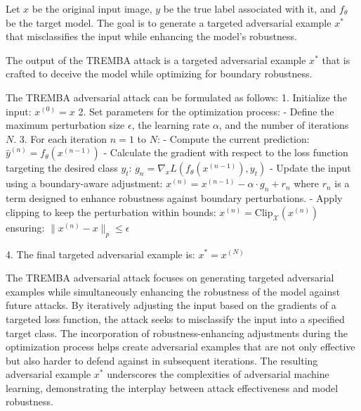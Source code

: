 Let $x$ be the original input image, $y$ be the true label associated with it, and $f_{\theta}$ be the target model. The goal is to generate a targeted adversarial example $x^*$ that misclassifies the input while enhancing the model's robustness.

The output of the TREMBA attack is a targeted adversarial example $x^*$ that is crafted to deceive the model while optimizing for boundary robustness.

The TREMBA adversarial attack can be formulated as follows:
1. Initialize the input:
   $x^{(0)} = x$
2. Set parameters for the optimization process:
   - Define the maximum perturbation size $\epsilon$, the learning rate $\alpha$, and the number of iterations $N$.
3. For each iteration $n = 1$ to $N$:
   - Compute the current prediction:
   $\hat{y}^{(n)} = f_{\theta}(x^{(n-1)})$
   - Calculate the gradient with respect to the loss function targeting the desired class $y_t$:
   $g_n = \nabla_x L(f_{\theta}(x^{(n-1)}), y_t)$
   - Update the input using a boundary-aware adjustment:
   $x^{(n)} = x^{(n-1)} - \alpha \cdot g_n + r_n$
   where $r_n$ is a term designed to enhance robustness against boundary perturbations.
   - Apply clipping to keep the perturbation within bounds:
   $x^{(n)} = \text{Clip}_{\mathcal{X}}(x^{(n)})$
   ensuring:
   $\|x^{(n)} - x\|_p \leq \epsilon$

4. The final targeted adversarial example is:
   $x^* = x^{(N)}$
   
The TREMBA adversarial attack focuses on generating targeted adversarial examples while simultaneously enhancing the robustness of the model against future attacks. By iteratively adjusting the input based on the gradients of a targeted loss function, the attack seeks to misclassify the input into a specified target class. The incorporation of robustness-enhancing adjustments during the optimization process helps create adversarial examples that are not only effective but also harder to defend against in subsequent iterations. The resulting adversarial example $x^*$ underscores the complexities of adversarial machine learning, demonstrating the interplay between attack effectiveness and model robustness.
